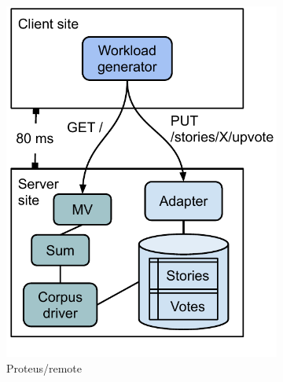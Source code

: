 \begin{figure}[H]
\begin{subfigure}[b]{0.24\textwidth}
            \centering
            \includegraphics[width=\textwidth]{./figures/evaluation/evaluation_deployments_proteus_remote.pdf}
            \caption{Proteus/remote}
            \label{fig:deployments_proteus_remote}
        \end{subfigure}
        \hfill
        \begin{subfigure}[b]{0.24\textwidth}
            \centering

\end{subfigure}
\end{figure}
